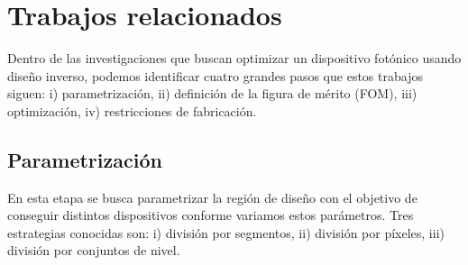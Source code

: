 \chapter{Trabajos relacionados}

Dentro de las investigaciones que buscan optimizar un dispositivo fotónico usando diseño inverso, podemos identificar cuatro grandes pasos que 
estos trabajos siguen: i) parametrización, ii) definición de la figura de mérito (FOM), iii) optimización, iv) restricciones de fabricación.


\section{Parametrización}

En esta etapa se busca parametrizar la región de diseño con el objetivo de conseguir distintos dispositivos conforme variamos estos parámetros.
Tres estrategias conocidas son: i) división por segmentos, ii) división por píxeles, iii) división por conjuntos de nivel.

